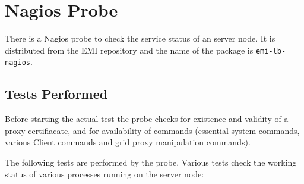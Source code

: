 %
%

\section{Nagios Probe}
\label{s:nagios}

There is a Nagios probe to check the service status of an \LB server node. It is distributed from the EMI repository and the name of the package is \texttt{emi-lb-nagios}. 

\subsection{Tests Performed}
Before starting the actual test the probe checks for existence and validity of a proxy certifiacate, and for availability of commands (essential system commands, various \LB Client commands and grid proxy manipulation commands).

The following tests are performed by the probe. Various tests check the working status of various processes running on the \LB server node:

